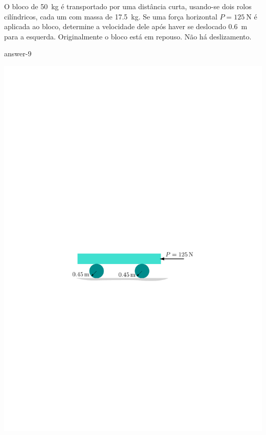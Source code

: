 \item O bloco de \SI{50}{\kilogram} é transportado por uma distância curta, usando-se dois rolos cilíndricos, cada um
com massa de \SI{17.5}{\kilogram}. Se uma força horizontal $P=\SI{125}{\newton}$ é aplicada ao bloco, determine a velocidade
dele após haver se deslocado \SI{.6}{\meter} para a esquerda. Originalmente o bloco está em repouso. Não há deslizamento.

{answer-9}

\vspace{-1cm}
\begin{flushright}
	\includegraphics[scale=.8]{../../images/draw_4}
\end{flushright}